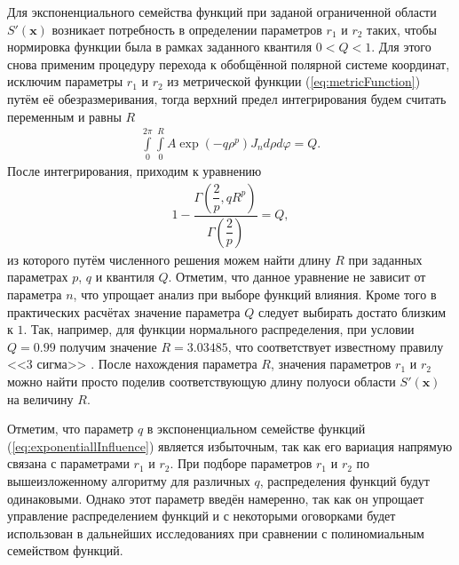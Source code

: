 Для экспоненциального семейства функций при заданой ограниченной области $S'(\boldsymbol{x})$ возникает потребность в определении параметров $r_1$ и $r_2$ таких, чтобы нормировка функции была в рамках заданного квантиля $0 < Q < 1$. Для этого снова применим процедуру перехода к обобщённой полярной системе координат, исключим параметры $r_1$ и $r_2$ из метрической функции (\ref{eq:metricFunction}) путём её обезразмеривания, тогда верхний предел интегрирования будем считать переменным и равны $R$
\begin{gather*}
	\int\limits_0^{2\pi}
		\int\limits_0^{R}
			A \exp \left(-q\rho^p \right) J_n
		d \rho
	d \varphi = Q.
\end{gather*}
После интегрирования, приходим к уравнению
\begin{gather}
	\label{eq:quantil}
	1 - \dfrac{
		\Gamma \left( \dfrac{2}{p}, q R^p \right)
		}{
		\Gamma \left( \dfrac{2}{p} \right)
		} = Q,
\end{gather}
из которого путём численного решения можем найти длину $R$ при заданных параметрах $p$, $q$ и квантиля $Q$. Отметим, что данное уравнение не зависит от параметра $n$, что упрощает анализ при выборе функций влияния. Кроме того в практических расчётах значение параметра $Q$ следует выбирать достато близким к $1$. Так, например, для функции нормального распределения, при условии $Q = 0.99$ получим значение $R = 3.03485$, что соответствует известному правилу <<3 сигма>> \cite{TeorVer}. После нахождения параметра $R$, значения параметров $r_1$ и $r_2$ можно найти просто поделив соответствующую длину полуоси области $S' (\boldsymbol{x})$ на величину $R$.

Отметим, что параметр $q$ в экспоненциальном семействе функций (\ref{eq:exponentiallInfluence}) является избыточным, так как его вариация напрямую связана с параметрами $r_1$ и $r_2$. При подборе параметров $r_1$ и $r_2$ по вышеизложенному алгоритму для различных $q$, распределения функций будут одинаковыми. Однако этот параметр введён намеренно, так как он упрощает управление распределением функций и с некоторыми оговорками будет использован в дальнейших исследованиях при сравнении с полиномиальным семейством функций.